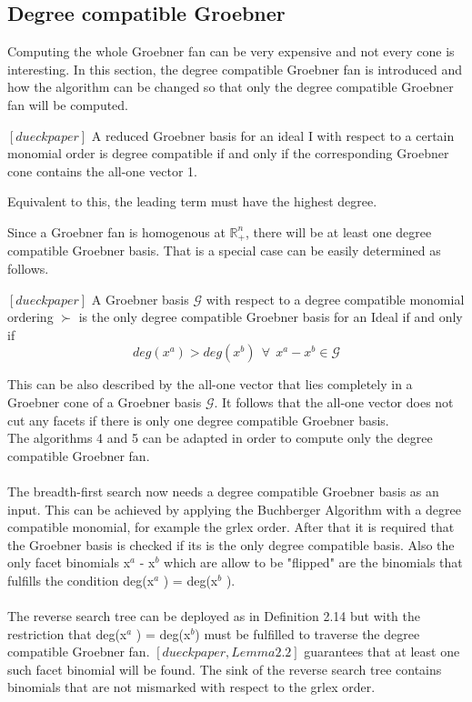 \subsection{Degree compatible Groebner}
Computing the whole Groebner fan can be very expensive and not every cone is interesting.
In this section, the degree compatible Groebner fan is introduced and how the algorithm can
be changed so that only the degree compatible Groebner fan will be computed.\\
\begin{env_definition}
$[dueck paper] $
A reduced Groebner basis for an ideal I with respect to a certain monomial order is
degree compatible if and only if the corresponding Groebner cone contains the all-one vector 1.
\end{env_definition}
Equivalent to this, the leading term must have the highest degree.

Since a Groebner fan is homogenous at $\mathbb{R}^{n}_{+}$, there will be at least one degree compatible Groebner basis.
That is a special case can be easily determined as follows.

\begin{env_definition}
$[dueck paper] $
A Groebner basis $\mathcal{G}$ with respect to a degree compatible monomial ordering $\succ$  is the only degree compatible Groebner basis for an Ideal if and only if
\[ deg(x^{a}) > deg(x^{b})~~ \forall~~ x^{a}-x^{b}\in \mathcal{G} \] 
\end{env_definition}

This can be also described by the all-one vector that lies completely in a Groebner cone of a Groebner basis $\mathcal{G}$.
It follows that the all-one vector does not cut any facets if there is only one degree compatible Groebner basis. \\

The algorithms 4 and 5 can be adapted in order to compute only the degree compatible Groebner fan.\\ \\
The breadth-first search now needs a degree compatible Groebner basis as an input. This can be achieved by applying the Buchberger Algorithm with a degree compatible monomial, for example the grlex order. After that it is required that the Groebner basis is checked if its is the only degree compatible basis. %
Also the only facet binomials x$^{a}$ - x$^{b}$ which are allow to be "flipped" are the binomials that fulfills the condition
deg(x$^{a}$ ) = deg(x$^{b} $ ). \\ \\
The reverse search tree can be deployed as in Definition 2.14 but with the restriction that deg(x$^{a}$ ) = deg(x$^{b}$) must be fulfilled to traverse the degree compatible Groebner fan.
$[dueckpaper, Lemma 2.2]$ guarantees that at least one such facet binomial will be found. 
The sink of the reverse search tree contains binomials that are not mismarked with respect to the grlex order. 

